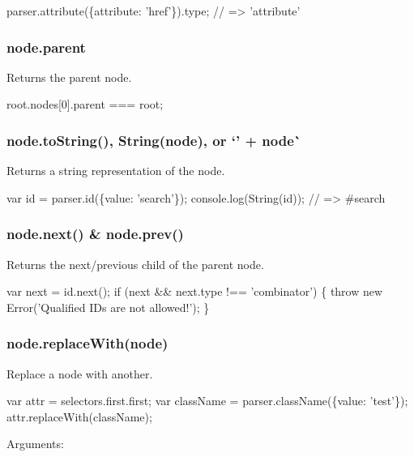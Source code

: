 \begin{DoxyCode}
parser.attribute(\{attribute: 'href'\}).type;
// => 'attribute'
\end{DoxyCode}


\subsubsection*{{\ttfamily node.\+parent}}

Returns the parent node.


\begin{DoxyCode}
root.nodes[0].parent === root;
\end{DoxyCode}


\subsubsection*{{\ttfamily node.\+to\+String()}, {\ttfamily String(node)}, or `'\textquotesingle{} + node\`{}}

Returns a string representation of the node.


\begin{DoxyCode}
var id = parser.id(\{value: 'search'\});
console.log(String(id));
// => #search
\end{DoxyCode}


\subsubsection*{{\ttfamily node.\+next()} \& {\ttfamily node.\+prev()}}

Returns the next/previous child of the parent node.


\begin{DoxyCode}
var next = id.next();
if (next && next.type !== 'combinator') \{
    throw new Error('Qualified IDs are not allowed!');
\}
\end{DoxyCode}


\subsubsection*{{\ttfamily node.\+replace\+With(node)}}

Replace a node with another.


\begin{DoxyCode}
var attr = selectors.first.first;
var className = parser.className(\{value: 'test'\});
attr.replaceWith(className);
\end{DoxyCode}


Arguments\+:


